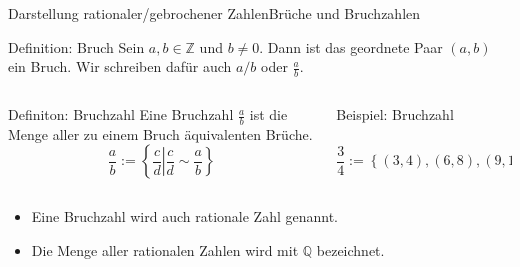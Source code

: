 \documentclass[xelatex,aspectratio=169]{beamer}
\begin{document}
\begin{frame}{Darstellung rationaler/gebrochener Zahlen}{Brüche und Bruchzahlen}
  \begin{block}{Definition: Bruch}
    Sein $a,b \in \mathbb{Z}$ und $b \neq 0$. Dann ist das geordnete Paar $(a,b)$ ein Bruch. Wir schreiben dafür auch $a/b$ oder $\frac{a}{b}$.
  \end{block}
  \begin{columns}[onlytextwidth]
    \begin{column}{0.39\textwidth}
      \begin{block}{Definiton: Bruchzahl}
        Eine Bruchzahl $\frac{a}{b}$ ist die Menge aller zu einem Bruch äquivalenten Brüche.
        \[
          \frac{a}{b} := \left\{ \left. \frac{c}{d} \right\rvert \frac{c}{d} \sim \frac{a}{b} \right\}
        \]

      \end{block}
    \end{column}
    \begin{column}{0.58\textwidth}
      \begin{exampleblock}{Beispiel: Bruchzahl}
        ~\\~
        \[
          \frac{3}{4} := \left\{ (3,4), (6,8), (9,12), \ldots \right\} = \left\{ \frac{3}{4}, \frac{6}{8}, \frac{9}{12}, \ldots \right\}
        \]

      \end{exampleblock}
    \end{column}
  \end{columns}
  \begin{itemize}
    \item Eine Bruchzahl wird auch rationale Zahl genannt.
    \item Die Menge aller rationalen Zahlen wird mit $\mathbb{Q}$ bezeichnet.
  \end{itemize}
\end{frame}
\end{document}
